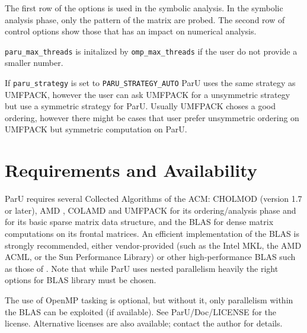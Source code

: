 \documentclass[12pt]{article}
\begin{document}
The first row of the options is used in the symbolic analysis. In the symbolic 
analysis phase, only the pattern of the matrix are probed. 
The second row of control options show those that has an impact on numerical 
analysis.

\verb'paru_max_threads' is initalized by \verb'omp_max_threads' if the user do 
not provide a smaller number.

If \verb'paru_strategy' is set to \verb'PARU_STRATEGY_AUTO' ParU uses the same 
strategy as UMFPACK, however the user can ask UMFPACK for a unsymmetric 
strategy but use a symmetric strategy for ParU. Usually UMFPACK choses a good 
ordering, however there might be cases that user prefer unsymmetric ordering on
UMFPACK but symmetric computation on ParU.
    
\section{Requirements and Availability}
\label{summary}

ParU requires several Collected Algorithms of the ACM: CHOLMOD
\cite{ChenDavisHagerRajamanickam09,DavisHager09} (version 1.7 or later), AMD
\cite{AmestoyDavisDuff96,AmestoyDavisDuff03}, COLAMD
\cite{DavisGilbertLarimoreNg00_algo,DavisGilbertLarimoreNg00} and UMFPACK 
\cite{10.1145/992200.992206} for its
ordering/analysis phase and for its basic sparse matrix data structure, and the
BLAS \cite{dddh:90} for dense matrix computations on its frontal matrices. 
An efficient implementation of the BLAS is strongly recommended, either
vendor-provided (such as the Intel MKL, the AMD ACML, or the 
Sun Performance Library) or other high-performance BLAS such as those of 
\cite{GotoVanDeGeijn08}. Note that while ParU uses nested parallelism heavily
the right options for BLAS library must be chosen.

The use of OpenMP tasking is optional, but
without it, only parallelism within the BLAS can be exploited (if available).
See ParU/Doc/LICENSE for the license.
Alternative licenses are also
available; contact the author for details.




\end{document}
